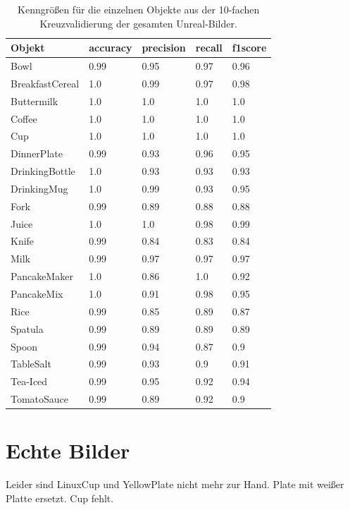 \begin{table}
\begin{tabularx}{\textwidth}{Xllll}
\textbf{Objekt}	& \textbf{\gls{accuracy}} & \textbf{\gls{precision}}	& \textbf{\gls{recall}}	& \textbf{\gls{f1score}} \\ \hline
Bowl & 0.99 & 0.95 & 0.97 & 0.96 \\  
BreakfastCereal & 1.0 & 0.99 & 0.97 & 0.98 \\  
Buttermilk & 1.0 & 1.0 & 1.0 & 1.0 \\  
Coffee & 1.0 & 1.0 & 1.0 & 1.0 \\  
Cup & 1.0 & 1.0 & 1.0 & 1.0 \\  
DinnerPlate & 0.99 & 0.93 & 0.96 & 0.95 \\  
DrinkingBottle & 1.0 & 0.93 & 0.93 & 0.93 \\  
DrinkingMug & 1.0 & 0.99 & 0.93 & 0.95 \\  
Fork & 0.99 & 0.89 & 0.88 & 0.88 \\  
Juice & 1.0 & 1.0 & 0.98 & 0.99 \\  
Knife & 0.99 & 0.84 & 0.83 & 0.84 \\  
Milk & 0.99 & 0.97 & 0.97 & 0.97 \\  
PancakeMaker & 1.0 & 0.86 & 1.0 & 0.92 \\  
PancakeMix & 1.0 & 0.91 & 0.98 & 0.95 \\  
Rice & 0.99 & 0.85 & 0.89 & 0.87 \\  
Spatula & 0.99 & 0.89 & 0.89 & 0.89 \\  
Spoon & 0.99 & 0.94 & 0.87 & 0.9 \\  
TableSalt & 0.99 & 0.93 & 0.9 & 0.91 \\  
Tea-Iced & 0.99 & 0.95 & 0.92 & 0.94 \\  
TomatoSauce & 0.99 & 0.89 & 0.92 & 0.9 \\   
\end{tabularx}
\caption[Objekt spezifische Kenngrößen des gesamten Unreal-Bilder Datensatzes]{Kenngrößen für die einzelnen Objekte aus der 10-fachen Kreuzvalidierung der gesamten Unreal-Bilder.}
\label{tab:unreal_1_classMetrics}
\end{table}


\section{Echte Bilder}
  
Leider sind LinuxCup und YellowPlate nicht mehr zur Hand. Plate mit weißer Platte ersetzt. Cup fehlt.